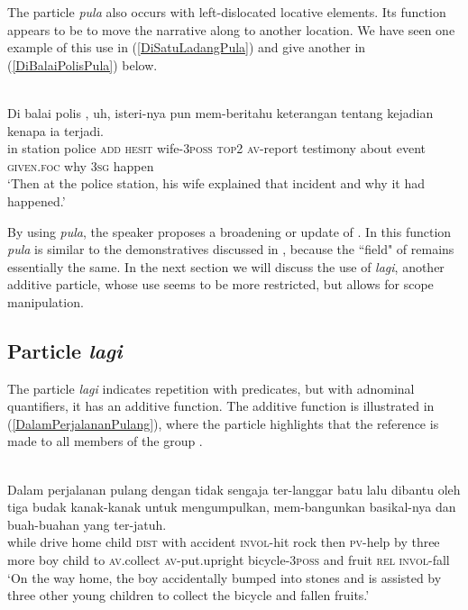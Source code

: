\documentclass[output=paper
,modfonts
,nonflat]{langsci/langscibook}
\begin{document}
\noindent
The particle \emph{pula} also occurs with left-dislocated locative elements. Its function appears to be to move the narrative along to another location. We have seen one example of this use in  (\ref{DiSatuLadangPula}) and give another in (\ref{DiBalaiPolisPula}) below.

\ea\label{DiBalaiPolisPula} 
\\
\gll  {\ob}Di balai   polis  , uh,   isteri-nya     pun  mem-beritahu keterangan tentang kejadian   kenapa ia  terjadi.\\
in station police \textsc{add}  \textsc{hesit} wife-\textsc{3poss} \textsc{top2} \textsc{av-}report      testimony  about   event    \textsc{given.foc} why    \textsc{3sg} happen\\
\glt `Then at the police station, his wife explained that incident and why it had happened.'
\z

\noindent
By using \emph{pula}, the speaker proposes a broadening or update of . In this function \emph{pula} is similar to the demonstratives discussed in , because the ``field" of  remains essentially the same. 
In the next section we will discuss the use of \emph{lagi}, another additive particle, whose use seems to be more restricted, but allows for scope manipulation.

\subsection{Particle \emph{lagi}}\label{ParticleLagi}
The particle \emph{lagi} indicates repetition with predicates, but with adnominal quantifiers, it has an additive function. The additive function is illustrated in  (\ref{DalamPerjalananPulang}), where the particle highlights that the reference is made to all members of the group \citep[84--85]{Forker2016}. 

\ea\label{DalamPerjalananPulang} 
\\
	\gll Dalam perjalanan pulang   dengan {tidak sengaja} ter-langgar    batu lalu dibantu      oleh  {\ob}tiga   budak kanak-kanak{\cb} untuk mengumpulkan, mem-bangunkan basikal-nya     dan  buah-buahan yang ter-jatuh.\\
while drive      home   child \textsc{dist} with   accident      \textsc{invol}-hit     rock then \textsc{pv}-help  by   three more  boy   child       to    \textsc{av.}collect       \textsc{av-}put.upright  bicycle\textsc{-3poss} and  fruit       \textsc{rel} \textsc{invol-}fall\\
\glt `On the way home, the boy accidentally bumped into stones and is assisted by three other young children to collect the bicycle and fallen fruits.'
\z
\end{document}
